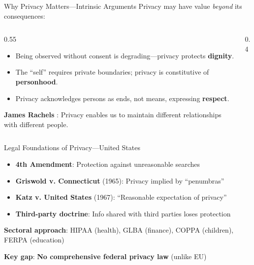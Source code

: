 ﻿\documentclass[aspectratio=169,11pt]{beamer}
\begin{document}
\begin{frame}{Why Privacy Matters---Intrinsic Arguments}
Privacy may have value \emph{beyond} its consequences:

\begin{columns}[T]
\begin{column}{0.55\textwidth}
\begin{itemize}
    \item Being observed without consent is degrading---privacy protects \textbf{dignity}.
    \item The ``self'' requires private boundaries; privacy is constitutive of \textbf{personhood}.
    \item Privacy acknowledges persons as ends, not means, expressing \textbf{respect}.
\end{itemize}

\vspace{0.3em}
\textbf{James Rachels} \parencite{rachels_privacy}: Privacy enables us to maintain different relationships with different people.
\end{column}
\begin{column}{0.4\textwidth}
\begin{center}
\end{center}
\end{column}
\end{columns}
\end{frame}

\begin{frame}{Legal Foundations of Privacy---United States}
\begin{conceptbox}
\small
\begin{itemize}
    \item \textbf{4th Amendment}: Protection against unreasonable searches
    \item \textbf{Griswold v. Connecticut} (1965): Privacy implied by ``penumbras''
    \item \textbf{Katz v. United States} (1967): ``Reasonable expectation of privacy''
    \item \textbf{Third-party doctrine}: Info shared with third parties loses protection
\end{itemize}
\end{conceptbox}

\vspace{0.2em}
\textbf{Sectoral approach}: HIPAA (health), GLBA (finance), COPPA (children), FERPA (education)

\textbf{Key gap}: \textbf{No comprehensive federal privacy law} (unlike EU)
\end{frame}
\end{document}
